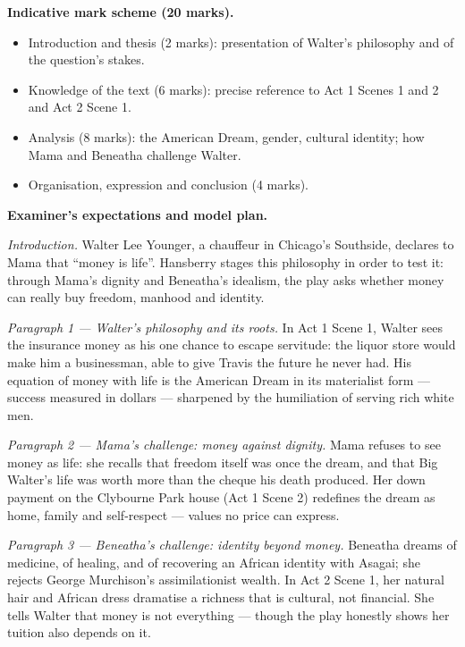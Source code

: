 \documentclass[11pt]{article}
\begin{document}
\begin{corrige}
\textbf{Indicative mark scheme (20 marks).}
\begin{itemize}
\item Introduction and thesis (2 marks): presentation of Walter's philosophy and of the question's stakes.
\item Knowledge of the text (6 marks): precise reference to Act 1 Scenes 1 and 2 and Act 2 Scene 1.
\item Analysis (8 marks): the American Dream, gender, cultural identity; how Mama and Beneatha challenge Walter.
\item Organisation, expression and conclusion (4 marks).
\end{itemize}

\textbf{Examiner's expectations and model plan.}

\emph{Introduction.} Walter Lee Younger, a chauffeur in Chicago's Southside, declares to Mama that ``money is life''. Hansberry stages this philosophy in order to test it: through Mama's dignity and Beneatha's idealism, the play asks whether money can really buy freedom, manhood and identity.

\emph{Paragraph 1 — Walter's philosophy and its roots.} In Act 1 Scene 1, Walter sees the insurance money as his one chance to escape servitude: the liquor store would make him a businessman, able to give Travis the future he never had. His equation of money with life is the American Dream in its materialist form — success measured in dollars — sharpened by the humiliation of serving rich white men.

\emph{Paragraph 2 — Mama's challenge: money against dignity.} Mama refuses to see money as life: she recalls that freedom itself was once the dream, and that Big Walter's life was worth more than the cheque his death produced. Her down payment on the Clybourne Park house (Act 1 Scene 2) redefines the dream as home, family and self-respect — values no price can express.

\emph{Paragraph 3 — Beneatha's challenge: identity beyond money.} Beneatha dreams of medicine, of healing, and of recovering an African identity with Asagai; she rejects George Murchison's assimilationist wealth. In Act 2 Scene 1, her natural hair and African dress dramatise a richness that is cultural, not financial. She tells Walter that money is not everything — though the play honestly shows her tuition also depends on it.


\end{corrige}
\end{document}
